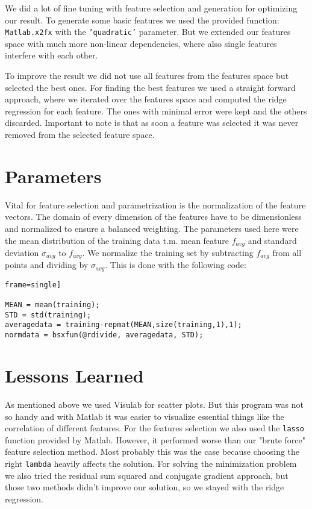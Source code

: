 \documentclass[a4paper, 11pt]{article}
\begin{document}
We did a lot of fine tuning with feature selection and generation for optimizing our result. To generate some basic features we used the provided function: \texttt{Matlab.x2fx} with the \texttt{'quadratic'} parameter. But we extended our features space with much more non-linear dependencies, where also single features interfere with each other.

To improve the result we did not use all features from the features space but selected the best ones. For finding the best features we used a straight forward approach, where we iterated over the features space and computed the ridge regression for each feature. The ones with minimal error were kept and the others discarded. Important to note is that as soon a feature was selected it was never removed from the selected feature space.


\section{Parameters}

Vital for feature selection and parametrization is the normalization of the feature vectors. The domain of every dimension of the features have to be dimensionless and normalized to ensure a balanced weighting. The parameters used here were the mean distribution of the training data t.m. mean feature $f_{avg}$ and standard deviation $\sigma_{avg}$ to $f_{avg}$. We normalize the training set by subtracting $f_{avg}$ from all points and dividing by $\sigma_{avg}$. This is done with the following code:

\begin{lstlisting}frame=single]

MEAN = mean(training);
STD = std(training);
averagedata = training-repmat(MEAN,size(training,1),1);
normdata = bsxfun(@rdivide, averagedata, STD);
\end{lstlisting}


\section{Lessons Learned}

As mentioned above we used Visulab for scatter plots. But this program was not so handy and with Matlab it was easier to visualize essential things like the correlation of different features.
For the features selection we also used the \texttt{lasso} function provided by Matlab. However, it performed worse than our "brute force" feature selection method. Most probably this was the case because choosing the right \texttt{lambda} heavily affects the solution.
For solving the minimization problem we also tried the residual sum squared and conjugate gradient approach, but those two methods didn't improve our solution, so we stayed with the ridge regression.
\end{document}
